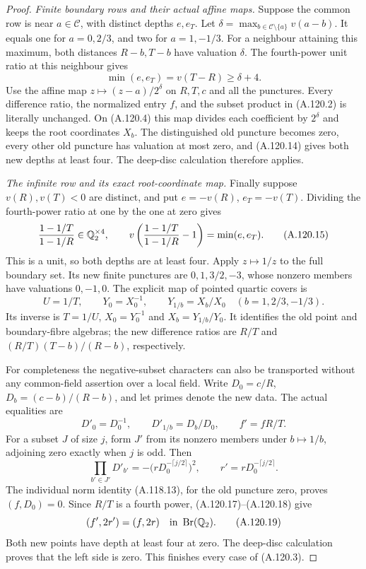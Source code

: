 \begin{proof}
\emph{Finite boundary rows and their actual affine maps.}
Suppose the common row is near $a\in\mathcal C$, with
distinct depths $e,e_T$.
Let
$\delta=\max_{b\in\mathcal C\setminus\{a\}}v(a-b)$.
It equals one for $a=0,2/3$, and two for $a=1,-1/3$.
For a neighbour attaining this maximum, both distances
$R-b,T-b$ have valuation $\delta$.
The fourth-power unit ratio at this neighbour gives
\[
                \min(e,e_T)=v(T-R)\ge\delta+4.
\tag{A.120.14}
\]
Use the affine map $z\mapsto(z-a)/2^\delta$ on
$R,T,c$ and all the punctures.
Every difference ratio, the normalized entry $f$, and
the subset product in (A.120.2) is literally unchanged.
On (A.120.4) this map divides each coefficient by
$2^\delta$ and keeps the root coordinates $X_b$.
The distinguished old puncture becomes zero, every
other old puncture has valuation at most zero, and
(A.120.14) gives both new depths at least four.
The deep-disc calculation therefore applies.

\emph{The infinite row and its exact root-coordinate map.}
Finally suppose $v(R),v(T)<0$ are distinct, and put
$e=-v(R)$, $e_T=-v(T)$.
Dividing the fourth-power ratio at one by the one at
zero gives
\[
       \frac{1-1/T}{1-1/R}\in\mathbb Q_2^{\times4},
       \qquad
       v\left(\frac{1-1/T}{1-1/R}-1\right)
                          =\min(e,e_T).
\tag{A.120.15}
\]
This is a unit, so both depths are at least four.
Apply $z\mapsto1/z$ to the full boundary set.
Its new finite punctures are
$0,1,3/2,-3$, whose nonzero members have valuations
$0,-1,0$.
The explicit map of pointed quartic covers is
\[
 U=1/T,\qquad Y_0=X_0^{-1},\qquad
 Y_{1/b}=X_b/X_0\quad(b=1,2/3,-1/3).
\tag{A.120.16}
\]
Its inverse is $T=1/U$, $X_0=Y_0^{-1}$ and
$X_b=Y_{1/b}/Y_0$.
It identifies the old point and boundary-fibre algebras;
the new difference ratios are $R/T$ and
$(R/T)(T-b)/(R-b)$, respectively.

For completeness the negative-subset characters can
also be transported without any common-field assertion
over a local field.
Write $D_0=c/R$, $D_b=(c-b)/(R-b)$, and let primes
denote the new data.
The actual equalities are
\[
 D'_0=D_0^{-1},\qquad D'_{1/b}=D_b/D_0,
            \qquad f'=fR/T.
\tag{A.120.17}
\]
For a subset $J$ of size $j$, form $J'$ from its nonzero
members under $b\mapsto1/b$, adjoining zero exactly
when $j$ is odd.
Then
\[
 \prod_{b'\in J'}D'_{b'}
       =-\bigl(rD_0^{-\lceil j/2\rceil}\bigr)^2,
       \qquad r'=rD_0^{-\lceil j/2\rceil}.
\tag{A.120.18}
\]
The individual norm identity (A.118.13), for the old
puncture zero, proves $(f,D_0)=0$.
Since $R/T$ is a fourth power, (A.120.17)--(A.120.18)
give
\[
          (f',2r')=(f,2r)
                      \quad\hbox{in }\operatorname{Br}(\mathbb Q_2).
\tag{A.120.19}
\]
Both new points have depth at least four at zero.
The deep-disc calculation proves that the left side is
zero.  This finishes every case of (A.120.3).


\end{proof}
